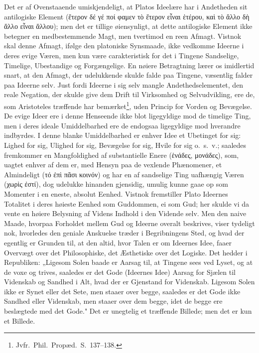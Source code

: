 \documentclass[12pt]{book}
\newcommand{\opage}[1]{\marginnote{\footnotesize\textit{[#1]}}}
\begin{document}
Det er af Ovenstaaende umiskjendeligt, at Platos Ideelære har i Andetheden sit antilogiske
Element (ἕτερον δέ γέ ποί φαμεν τὸ ἕτερον εἶναι ἑτέρου, καὶ τὸ ἄλλο δὴ ἄλλο εἶναι ἄλλου); men det
er tillige øiensynligt, at dette antilogiske Element ikke betegner en medbestemmende Magt, men
tvertimod en reen Afmagt. Vistnok skal denne Afmagt, ifølge den platoniske Synsmaade, ikke
vedkomme Ideerne i
\opage{184} deres evige Væren, men kun være carakteristisk for det i Tingene Sandselige, Timelige,
Ubestandige og Forgængelige. En nøiere Betragtning lærer os imidlertid snart, at den Afmagt, der
udelukkende skulde falde paa Tingene, væsentlig falder paa Ideerne selv. Just fordi Ideerne i sig
selv mangle Andethedselementet, den reale Negation, der skulde give dem Drift til Virksomhed og
Selvudvikling, ere de, som Aristoteles træffende har bemærket\footnote{Jvfr.\ Phil.\ Propæd.\
S.~137--138.}, uden Princip for Vorden og Bevægelse. De evige Ideer ere i denne Henseende ikke
blot ligegyldige mod de timelige Ting, men i deres ideale Umiddelbarhed ere de endogsaa
ligegyldige mod hverandre indbyrdes. I denne blanke Umiddelbarhed er enhver Idee et Ubetinget for
sig: Lighed for sig, Ulighed for sig, Bevægelse for sig, Hvile for sig o.\ s.\ v.; saaledes
fremkommer en Mangfoldighed af substantielle Enere (ἑνάδες, μονάδες), som, uagtet enhver af dem
er, med Hensyn paa de vexlende Phænomener, et Almindeligt (τό ἐπὶ πᾶσι κοινόν) og har en af
sandselige Ting uafhængig Væren (χωρὶς ἐστί), dog udelukke hinanden gjensidig, umulig kunne gaae
op som Momenter i en eneste, absolut Eenhed. Vistnok fremstiller Plato Ideernes Totalitet i deres
høieste Eenhed som Guddommen, ei som Gud; her skulde vi da vente en høiere Belysning af Videns
Indhold i den Vidende selv. Men den naive Maade, hvorpaa Forholdet mellem Gud og Ideerne overalt
beskrives, viser tydeligt nok, hvorledes den geniale Anskuelse træder i Begribningens Sted, og
hvad der egentlig er Grunden til, at den altid, hvor Talen er om Ideernes Idee, faaer Overvægt
over det Philosophiske, det Æsthetiske over det Logiske. Det hedder i Republiken: „Ligesom Solen
baade er Aarsag til, at Tingene sees ved Lyset, og at de voxe og trives, saaledes er det Gode
(Ideernes Idee) Aarsag for Sjælen til Videnskab og Sandhed i Alt, hvad der er Gjenstand for
Videnskab. Ligesom Solen ikke er
\opage{185} Synet eller det Sete, men staaer over begge, saaledes er det Gode ikke Sandhed eller Videnskab,
men staaer over dem begge, idet de begge ere beslægtede med det Gode." Det er unegtelig et
træffende Billede; men det er kun et Billede.
\end{document}
